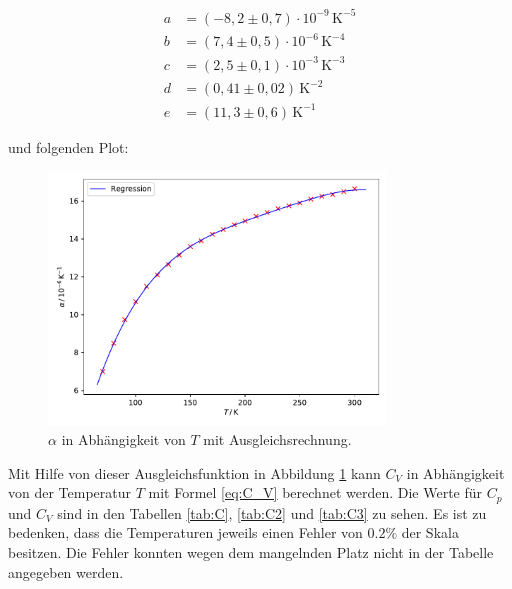 \begin{align*}
    a &= (-8, \! 2 \pm 0, \! 7) \cdot 10^{-9} \, \mathrm{K}^{-5} \\
    b &= (7, \! 4 \pm 0, \! 5) \cdot 10^{-6} \, \mathrm{K}^{-4} \\
    c &= (2, \! 5 \pm 0, \! 1) \cdot 10^{-3} \, \mathrm{K}^{-3} \\
    d &= (0, \! 41 \pm 0, \! 02) \, \mathrm{K}^{-2} \\
    e &= (11, \! 3 \pm 0, \! 6) \, \mathrm{K}^{-1}
\end{align*}

und folgenden Plot:

\begin{figure}[H]
    \centering
    \includegraphics[width=0.8\textwidth]{build/alpha.pdf}
    \caption{$\alpha$ in Abhängigkeit von $T$ mit Ausgleichsrechnung.}
    \label{fig:alpha_plot}
\end{figure}

Mit Hilfe von dieser Ausgleichsfunktion in Abbildung \ref{fig:alpha_plot} kann $C_V$ in Abhängigkeit von der Temperatur $T$ mit Formel \eqref{eq:C_V} berechnet werden. Die Werte für $C_p$ und $C_V$ sind in den Tabellen \ref{tab:C}, \ref{tab:C2} und \ref{tab:C3} zu sehen. Es ist zu bedenken, dass die Temperaturen jeweils einen Fehler von $ 0.2 \%$ der Skala besitzen. 
Die Fehler konnten wegen dem mangelnden Platz nicht in der Tabelle angegeben werden.

